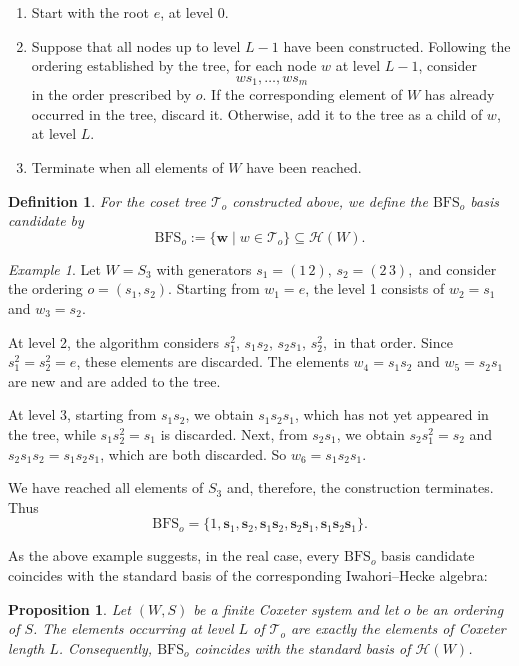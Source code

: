 \documentclass[11pt, reqno]{amsart}
\newcommand{\cH}{\mathcal{H}}
\newcommand{\BFS}{\mathrm{BFS}}
\numberwithin{equation}{section}
\newtheorem{definition}[theorem]{Definition}
\newtheorem{proposition}[theorem]{Proposition}
\theoremstyle{remark}
\newtheorem{example}[theorem]{Example}
\begin{document}
	\begin{enumerate}
		\item Start with the root $e$, at level $0$. \smallbreak
		
		\item Suppose that all nodes up to level $L-1$ have been constructed. 
		Following the ordering established by the tree, for each node $w$ at level $L-1$, consider
		\[
		ws_1,\ldots,ws_m
		\]
		in the order prescribed by $o$. If the corresponding element of $W$ has already occurred in the tree, discard it. Otherwise, add it to the tree as a child of $w$, at level $L$. \smallbreak
		
		\item Terminate when all elements of $W$ have been reached.
	\end{enumerate}
	
		
	\begin{definition}{\rm
			For the coset tree $\mathcal{T}_o$ constructed above, we define the \emph{$\BFS_o$ basis candidate} by
			\[
			\BFS_o:=\{{\mathbf{w}}\mid w\in\mathcal{T}_o\}\subseteq\cH(W).
			\]}
	\end{definition}
	\begin{example}
		Let $W=S_3$ with generators
		$
		s_1=(1\,2),\, s_2=(2\,3),$
		and consider the ordering $o=(s_1,s_2)$. Starting from $w_1=e$, the  level 1 consists of $w_2=s_1$ and $w_3=s_2$.
		
		At level 2, the algorithm considers
		$
		s_1^2,\,s_1s_2,\, s_2s_1,\, s_2^2,$ in that order.
		Since $s_1^2=s_2^2=e$, these elements are discarded. The elements $w_4=s_1s_2$ and $w_5=s_2s_1$ are new and are added to the tree.  
		
		At level $3$, starting from $s_1s_2$, we obtain $s_1s_2s_1$, which has not yet appeared in the tree, while $s_1s_2^2=s_1$ is discarded. Next, from $s_2s_1$, we obtain $s_2s_1^2=s_2$ and $s_2s_1s_2=s_1s_2s_1$, which are both discarded. So $w_6=s_1s_2s_1$.
		
		We have reached all elements of $S_3$ and, therefore, the construction terminates. Thus
		\[
		\BFS_o=
		\{1,{\mathbf{s}_1},{\mathbf{s}_2},
		{\mathbf{s}_1\mathbf{s}_2},
		{\mathbf{s}_2\mathbf{s}_1},
		{\mathbf{s}_1\mathbf{s}_2\mathbf{s}_1}\}.
		\]
	\end{example}
	
	As the above example suggests, in the real case, every $\BFS_o$ basis candidate coincides with the standard basis of the corresponding Iwahori--Hecke algebra:
	
	\begin{proposition}\label{real}
		Let $(W,S)$ be a finite Coxeter system and let $o$ be an ordering of $S$. The elements occurring at level $L$ of $\mathcal T_o$ are exactly the elements of Coxeter length $L$. Consequently, $\BFS_o$ coincides with the standard basis of $\cH(W)$.
	\end{proposition}
	
\end{document}
